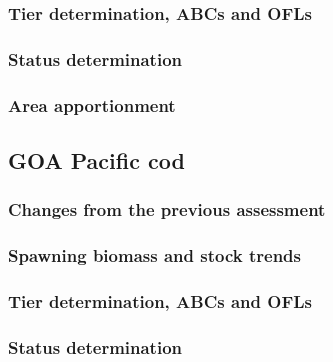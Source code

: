 \documentclass[]{tufte-handout}
\begin{document}
\hypertarget{tier-determination-abcs-and-ofls-1}{%
\subsubsection{Tier determination, ABCs and
OFLs}\label{tier-determination-abcs-and-ofls-1}}

\hypertarget{status-determination-2}{%
\subsubsection{Status determination}\label{status-determination-2}}

\hypertarget{area-apportionment-2}{%
\subsubsection{Area apportionment}\label{area-apportionment-2}}

\hypertarget{goa-pacific-cod-2}{%
\subsection{GOA Pacific cod}\label{goa-pacific-cod-2}}

\hypertarget{changes-from-the-previous-assessment-3}{%
\subsubsection{Changes from the previous
assessment}\label{changes-from-the-previous-assessment-3}}

\hypertarget{spawning-biomass-and-stock-trends-3}{%
\subsubsection{Spawning biomass and stock
trends}\label{spawning-biomass-and-stock-trends-3}}

\hypertarget{tier-determination-abcs-and-ofls-2}{%
\subsubsection{Tier determination, ABCs and
OFLs}\label{tier-determination-abcs-and-ofls-2}}

\hypertarget{status-determination-3}{%
\subsubsection{Status determination}\label{status-determination-3}}
\end{document}
